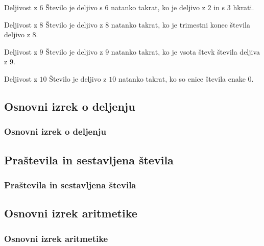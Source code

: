        \begin{frame}
            \begin{alertblock}{Deljivost z $6$}
                Število je deljivo s $6$ natanko takrat, ko je deljivo z $2$ in s $3$ hkrati.
            \end{alertblock}

            \begin{alertblock}{Deljivost z $8$}
                Število je deljivo z $8$ natanko takrat, ko je trimestni konec števila deljivo z $8$.
            \end{alertblock}

            \begin{alertblock}{Deljivost z $9$}
                Število je deljivo z $9$ natanko takrat, ko je vsota števk števila deljiva z $9$.
            \end{alertblock}

            \begin{alertblock}{Deljivost z $10$}
                Število je deljivo z $10$ natanko takrat, ko so enice števila enake $0$.
            \end{alertblock}

        \end{frame}




    \subsection{Osnovni izrek o deljenju}

        \begin{frame}
            \frametitle{Osnovni izrek o deljenju}
        \end{frame}

    \subsection{Praštevila in sestavljena števila}

        \begin{frame}
            \frametitle{Praštevila in sestavljena števila}
        \end{frame}

    \subsection{Osnovni izrek aritmetike}

        \begin{frame}
            \frametitle{Osnovni izrek aritmetike}
        \end{frame}

